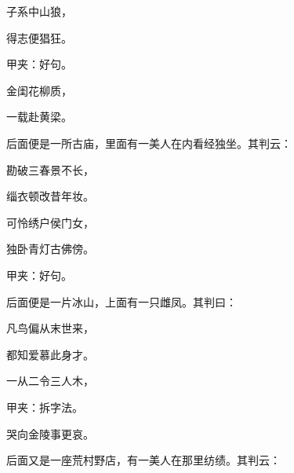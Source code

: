 \begin{poem}
    \begin{pl}子系中山狼，\end{pl}

    \begin{pl}得志便猖狂。\end{pl}\begin{note}甲夹：好句。\end{note}

    \begin{pl}金闺花柳质，\end{pl}

    \begin{pl}一载赴黄梁。\end{pl}

\end{poem}

\begin{parag}

    后面便是一所古庙，里面有一美人在内看经独坐。其判云：
\end{parag}

\begin{poem}
    \begin{pl}勘破三春景不长，\end{pl}

    \begin{pl}缁衣顿改昔年妆。\end{pl}

    \begin{pl}可怜绣户侯门女，\end{pl}

    \begin{pl}独卧青灯古佛傍。\end{pl}

    \begin{note}甲夹：好句。\end{note}
\end{poem}

\begin{parag}

    后面便是一片冰山，上面有一只雌凤。其判曰：
\end{parag}

\begin{poem}
    \begin{pl}凡鸟偏从末世来，\end{pl}

    \begin{pl}都知爱慕此身才。\end{pl}

    \begin{pl}一从二令三人木，\end{pl}\begin{note}甲夹：拆字法。\end{note}

    \begin{pl}哭向金陵事更哀。\end{pl}
\end{poem}
\begin{parag}

    后面又是一座荒村野店，有一美人在那里纺绩。其判云：
\end{parag}

